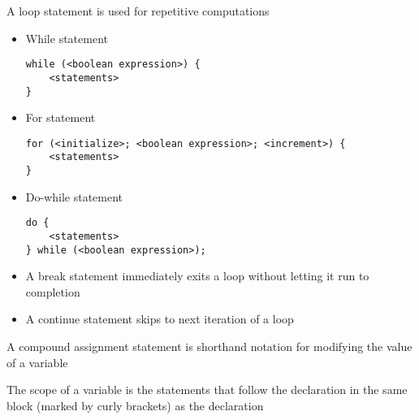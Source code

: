 \documentclass[8pt,a4paper,compress]{beamer}
\begin{document}
\begin{frame}[fragile]
A loop statement is used for repetitive computations

\begin{itemize}
\item While statement
\begin{lstlisting}[language={}]
while (<boolean expression>) {
    <statements>
}
\end{lstlisting}

\item For statement
\begin{lstlisting}[language={}]
for (<initialize>; <boolean expression>; <increment>) {
    <statements>
}
\end{lstlisting}

\item Do-while statement
\begin{lstlisting}[language={}]
do {
    <statements>
} while (<boolean expression>);
\end{lstlisting}

\item A break statement immediately exits a loop without letting it run to completion

\item A continue statement skips to next iteration of a loop
\end{itemize}

\bigskip

A compound assignment statement is shorthand notation for modifying the value of a variable

\bigskip

The scope of a variable is the statements that follow the declaration in the same block (marked by curly brackets) as the declaration
\end{frame}
\end{document}
